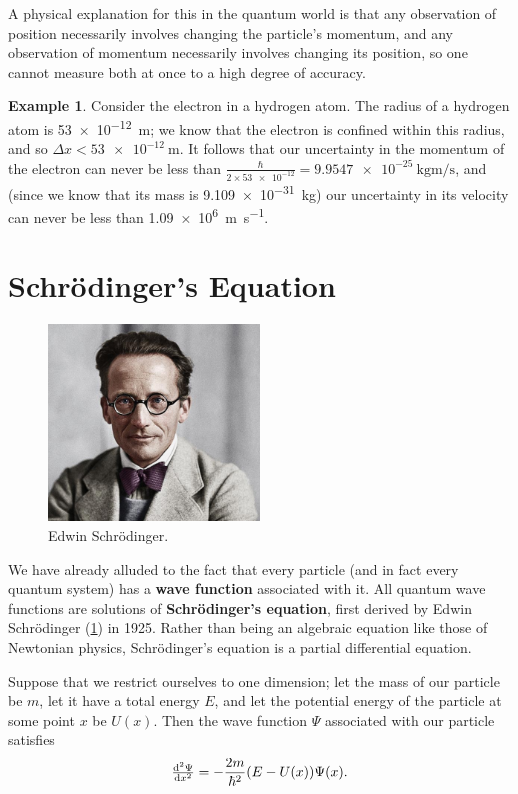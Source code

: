 \documentclass[a4paper]{amsbook}
\theoremstyle{definition}
\newtheorem*{example}{Example}
\numberwithin{exercise}{chapter}
\numberwithin{exercise}{chapter}
\begin{document}
A physical explanation for this in the quantum world is that any observation of position necessarily involves changing the particle's momentum,
and any observation of momentum necessarily involves changing its position, so one cannot measure both at once to a high degree of accuracy.

\begin{example}
  Consider the electron in a hydrogen atom. The radius of a hydrogen atom is \SI{53e-12}{\metre}; we know that the electron is confined within
  this radius, and so $ \Delta x < \SI{53e-12}{\metre} $. It follows that our uncertainty in the momentum of the electron can never be less
  than $ \frac{\hbar}{2\times \num{53e-12}} = \SI{9.9547e-25}{\kilo\gram\metre\per\second} $, and (since we know that its mass is \SI{9.109e-31}{\kilo\gram})
  our uncertainty in its velocity can never be less than \SI{1.09e6}{\metre\per\second}.
\end{example}

\section{Schr\"odinger's Equation}
\begin{figure}
  \centering
  \includegraphics[width=0.5\textwidth]{schrodinger}
  \caption{Edwin Schr\"odinger. \label{fig:schrodinger}}
\end{figure}
We have already alluded to the fact that every particle (and in fact every quantum system) has a \textbf{wave function} associated with it. All quantum
wave functions are solutions of \textbf{Schr\"odinger's equation}, first derived by Edwin Schr\"odinger (\cref{fig:schrodinger}) in 1925. Rather than
being an algebraic equation like those of Newtonian physics, Schr\"odinger's equation is a partial differential equation.

Suppose that we restrict ourselves to one dimension; let the mass of our particle be $ m $, let it have a total energy $ E $, and let the potential energy
of the particle at some point $ x $ be $ U(x) $. Then the wave function $ \Psi $ associated with our particle satisfies
\begin{equation}
  \od[2]{\Psi}{x} = -\frac{2m}{\hbar^2} (E - U(x)) \Psi(x).
\end{equation}
\end{document}
